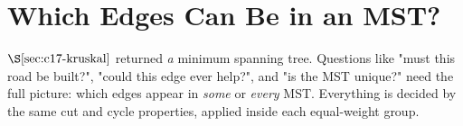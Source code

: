\section{Which Edges Can Be in an MST?}\label{sec:c17-classify}

\begin{previouslybox}
\(\secref{c17-kruskal}\) returned \emph{a} minimum spanning tree.  Questions
like "must this road be built?", "could this edge ever help?", and "is the MST
unique?" need the full picture: which edges appear in \emph{some} or \emph{every}
MST.  Everything is decided by the same cut and cycle properties, applied inside
each equal-weight group.
\end{previouslybox}

